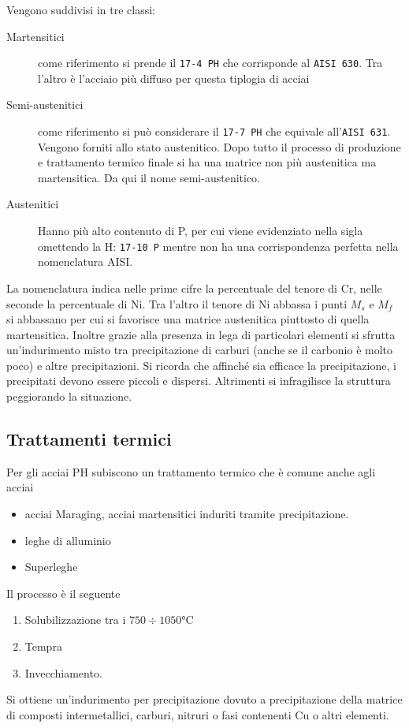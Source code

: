 Vengono suddivisi in tre classi:
\begin{description}
\item[Martensitici] come riferimento si prende il \texttt{17-4 PH} che corrisponde al \texttt{AISI 630}. Tra l'altro è l'acciaio più diffuso per questa tiplogia di acciai
\item[Semi-austenitici] come riferimento si può considerare il \texttt{17-7 PH} che equivale all'\texttt{AISI 631}. Vengono forniti allo stato austenitico. Dopo tutto il processo di produzione e trattamento termico finale si ha una matrice non più austenitica ma martensitica. Da qui il nome semi-austenitico.
\item[Austenitici] Hanno più alto contenuto di P, per cui viene evidenziato nella sigla omettendo la H: \texttt{17-10 P} mentre non ha una corrispondenza perfetta nella nomenclatura \ac{AISI}.
\end{description}
La nomenclatura indica nelle prime cifre la percentuale del tenore di Cr, nelle seconde la percentuale di Ni.
Tra l'altro il tenore di Ni abbassa i punti $M_s$ e $M_f$ si abbassano per cui si favorisce una matrice austenitica piuttosto di quella martensitica.
Inoltre grazie alla presenza in lega di particolari elementi si sfrutta un'indurimento misto tra precipitazione di carburi (anche se il carbonio è molto poco) e altre precipitazioni.
Si ricorda che affinché sia efficace la precipitazione, i precipitati devono essere piccoli e dispersi. Altrimenti si infragilisce la struttura peggiorando la situazione.

\subsection{Trattamenti termici}
Per gli acciai \ac{PH} subiscono un trattamento termico che è comune anche agli acciai
\begin{itemize}
\item acciai Maraging, acciai martensitici induriti tramite precipitazione.
\item leghe di alluminio
\item Superleghe
\end{itemize}

Il processo è il seguente
\begin{enumerate}
\item Solubilizzazione tra i $750\div1050\unit{\celsius}$
\item Tempra
\item Invecchiamento.
\end{enumerate}
Si ottiene un'indurimento per precipitazione dovuto a precipitazione della matrice di composti intermetallici, carburi, nitruri o fasi contenenti Cu o altri elementi.

